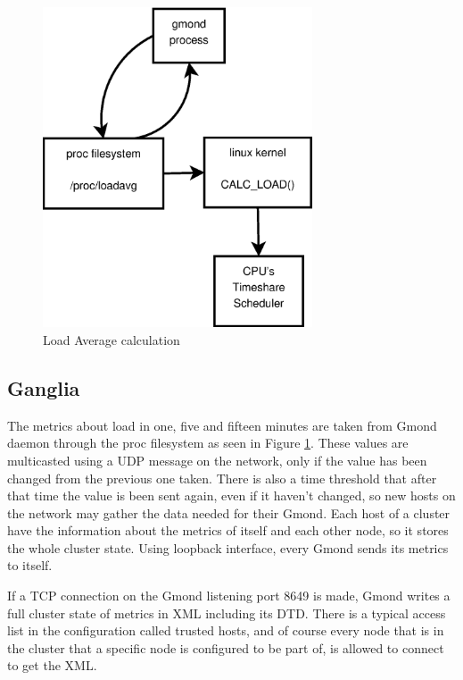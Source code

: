 \begin{figure}[htb]
\centering
 \includegraphics[width=80mm]{images/calc_load.eps}
\caption{Load Average calculation}
\label{figure:calc_load}
\end{figure}


\subsection{Ganglia}\label{subsec:ganglia}

The metrics about load in one, five and fifteen minutes are taken from Gmond daemon through the proc filesystem as seen in Figure \ref{figure:calc_load}. These values are multicasted using a UDP message on the network, only if the value has been changed from the previous one taken. There is also a time threshold that after that time the value is been sent again, even if it haven't changed, so new hosts on the network may gather the data needed for their Gmond. Each host of a cluster have the information about the metrics of itself and each other node, so it stores the whole cluster state. Using loopback interface, every Gmond sends its metrics to itself.

If a TCP connection on the Gmond listening port 8649 is made, Gmond writes a full cluster state of metrics in XML including its DTD. There is a typical access list in the configuration called trusted hosts, and of course every node that is in the cluster that a specific node is configured to be part of, is allowed to connect to get the XML.


